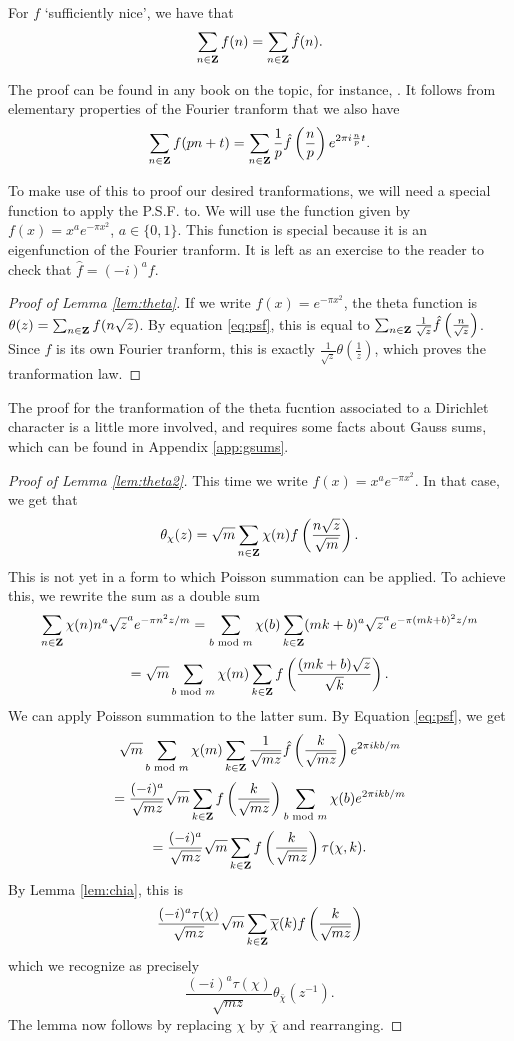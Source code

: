 \documentclass{amsart}
\begin{document}
\begin{theorem}
\label{thm:psf}
For $f$ `sufficiently nice', we have that
\[\sum_{n\in \bf Z}f(n) = \sum_{n\in \bf Z}\hat f(n).  \]
\end{theorem}
The proof can be found in any book on the topic, for instance, \cite[Theorem 8.32]{folland99}.
It follows from elementary properties of the Fourier tranform that we also have
\begin{equation}
  \label{eq:psf}
  \sum_{n\in \bf Z}f(pn + t) = \sum_{n\in \bf Z}\frac{1}{p}\hat f\left(\frac{n}{p}\right)e^{2\pi i\frac{n}{p} t}.
\end{equation}

To make use of this to proof our desired tranformations, we will need a special function to apply the P.S.F. to. We will use the function given by $f(x) = x^ae^{-\pi x^2}$, $a\in \{0,1\}$. This function is special because it is an eigenfunction of the Fourier tranform. It is left as an exercise to the reader to check that $\hat f = (-i)^a f$.

\begin{proof}[Proof of Lemma \ref{lem:theta}]
  If we write $f(x) = e^{-\pi x^2}$, the theta function is $\theta(z) = \sum_{n\in \bf Z} f(n\sqrt{z})$. By equation \eqref{eq:psf}, this is equal to $\sum_{n\in \bf Z} \frac{1}{\sqrt{z}} \hat f \left( \frac{n}{\sqrt{z}} \right)$. Since $f$ is its own Fourier tranform, this is exactly $\frac{1}{\sqrt{z}} \theta \left( \frac{1}{z} \right)$, which proves the tranformation law. 
\end{proof}

The proof for the tranformation of the theta fucntion associated to a Dirichlet character is a little more involved, and requires some facts about Gauss sums, which can be found in Appendix \ref{app:gsums}.
\begin{proof}[Proof of Lemma \ref{lem:theta2}]
  This time we write $f(x) = x^ae^{-\pi x^2}$. In that case, we get that
  \[\theta_\chi(z) =\sqrt{m} \sum_{n\in \mathbf{Z}}\chi(n) f \left( \frac{n\sqrt{z}}{\sqrt{m}} \right). \]
  This is not yet in a form to which Poisson summation can be applied. To achieve this, we rewrite the sum as a double sum
  \[\sum_{n\in \mathbf{Z}} \chi(n)n^a\sqrt{z}^ae^{-\pi n^2z/m} = \sum_{b \text{ mod } m}\chi(b)\sum_{k\in \mathbf{Z}} (mk+b)^a\sqrt{z}^ae^{-\pi (mk+b)^2z/m} \]
  \[= \sqrt{m} \sum_{b\text{ mod } m} \chi(m)\sum_{k\in \mathbf{Z}} f \left( \frac{(mk+b)\sqrt{z}}{\sqrt{k}} \right). \]
  We can apply Poisson summation to the latter sum. By Equation \eqref{eq:psf}, we get
  \[ \sqrt{m} \sum_{b\text{ mod } m} \chi(m)\sum_{k\in \mathbf{Z}}\frac{1}{\sqrt{mz}} \hat f \left( \frac{k}{\sqrt{mz}} \right)e^{2\pi i kb/m} \]
  \[= \frac{(-i)^a}{\sqrt{mz}}\sqrt{m} \sum_{k\in\mathbf{Z}} f \left( \frac{k}{\sqrt{mz}} \right)\sum_{b\text{ mod } m}\chi(b)e^{2\pi i kb/m} \]
  \[ = \frac{(-i)^a}{\sqrt{mz}}\sqrt{m} \sum_{k\in\mathbf{Z}} f \left( \frac{k}{\sqrt{mz}} \right)\tau(\chi,k). \]
  By Lemma \ref{lem:chia}, this is
  \[\frac{(-i)^a\tau(\chi)}{\sqrt{mz}}\sqrt{m} \sum_{k\in\mathbf{Z}}\overline{\chi}(k) f \left( \frac{k}{\sqrt{mz}} \right) \]
  which we recognize as precisely
  \[\frac{(-i)^a\tau(\chi)}{\sqrt{mz}}\theta_{\bar\chi}(z^{-1}). \]
  The lemma now follows by replacing $\chi$ by $\bar\chi$ and rearranging.
\end{proof}

\printbibliography
\end{document}

